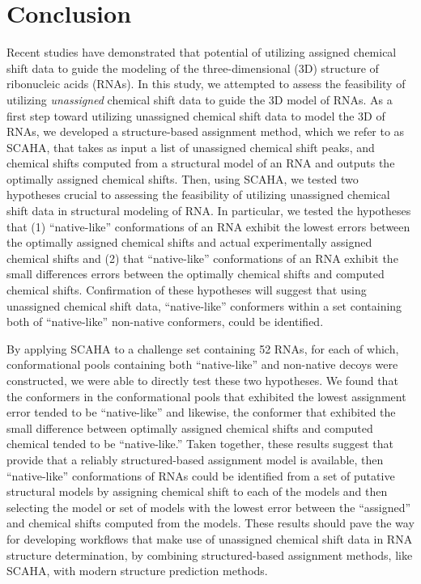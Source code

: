 \documentclass[journal=jcisd8,manuscript=article,layout=onecolumn]{achemso}
\begin{document}
\section{Conclusion}
Recent studies have demonstrated that potential of utilizing assigned chemical shift data to guide the modeling of the three-dimensional (3D) structure of ribonucleic acids (RNAs). In this study, we attempted to assess the feasibility of utilizing \textit{unassigned} chemical shift data to guide the 3D model of RNAs. As a first step toward utilizing unassigned chemical shift data to model the 3D of RNAs, we developed a structure-based assignment method, which we refer to as SCAHA, that takes as input a list of unassigned chemical shift peaks, and chemical shifts computed from a structural model of an RNA and outputs the optimally assigned chemical shifts. Then, using SCAHA, we tested two hypotheses crucial to assessing the feasibility of utilizing unassigned chemical shift data in structural modeling of RNA. In particular, we tested the hypotheses that (1) ``native-like'' conformations of an RNA exhibit the lowest errors between the optimally assigned chemical shifts and actual experimentally assigned chemical shifts and (2) that ``native-like'' conformations of an RNA exhibit the small differences errors between the optimally chemical shifts and computed chemical shifts. Confirmation of these hypotheses will suggest that using unassigned chemical shift data, ``native-like'' conformers within a set containing both of ``native-like'' non-native conformers, could be identified. 

By applying SCAHA to a challenge set containing 52 RNAs, for each of which, conformational pools containing both ``native-like'' and non-native decoys were constructed, we were able to directly test these two hypotheses. We found that the conformers in the conformational pools  that exhibited the lowest assignment error tended to be ``native-like'' and likewise, the conformer that exhibited the small difference between optimally assigned chemical shifts and computed chemical tended to be ``native-like.'' Taken together, these results suggest that provide that a reliably structured-based assignment model is available, then ``native-like'' conformations of RNAs could be identified from a set of putative structural models by assigning chemical shift to each of the models and then selecting the model or set of models with the lowest error between the ``assigned'' and chemical shifts computed from the models. These results should pave the way for developing workflows that make use of unassigned chemical shift data in RNA structure determination, by combining structured-based assignment methods, like SCAHA, with modern structure prediction methods.
\end{document}
